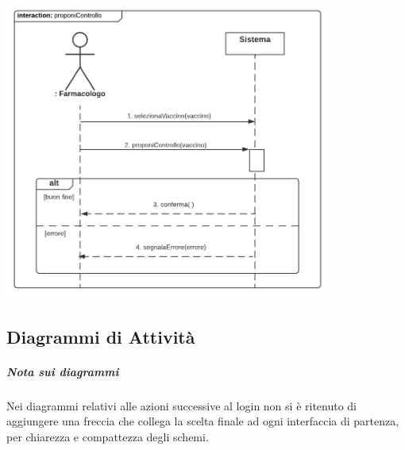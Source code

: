 \documentclass[11pt]{article}
\begin{document}
                \begin{center}
                    \includegraphics[width=0.80\textwidth]{pictures/SDFarmacolo2_proponeControllo.png}
                \end{center}

    \newpage
        \subsection{Diagrammi di Attività}
            \subparagraph*{Nota sui diagrammi}
            Nei diagrammi relativi alle azioni successive al login non si è ritenuto di aggiungere una freccia che collega la scelta finale ad ogni interfaccia di partenza, per chiarezza e compattezza degli schemi.\\
\end{document}
